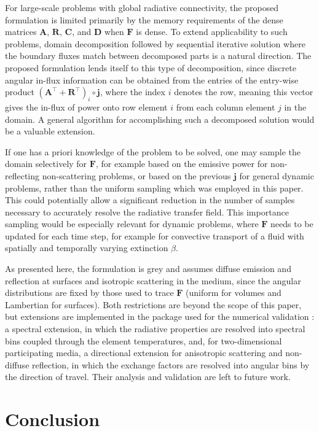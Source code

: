 \documentclass[preprint,1p,times]{elsarticle}
\theoremstyle{plain}
\theoremstyle{definition}
\theoremstyle{remark}
\begin{document}
For large-scale problems with global radiative connectivity, the proposed formulation is limited primarily by the memory requirements of the dense matrices $\mathbf{A}$, $\mathbf{R}$, $\mathbf{C}$, and $\mathbf{D}$ when $\mathbf{F}$ is dense. To extend applicability to such problems, domain decomposition followed by sequential iterative solution where the boundary fluxes match between decomposed parts is a natural direction. The proposed formulation lends itself to this type of decomposition, since discrete angular in-flux information can be obtained from the entries of the entry-wise product $(\mathbf{A}^\top+\mathbf{R}^\top)_i \circ \mathbf{j}$, where the index $i$ denotes the row, meaning this vector gives the in-flux of power onto row element $i$ from each column element $j$ in the domain. A general algorithm for accomplishing such a decomposed solution would be a valuable extension.

If one has a priori knowledge of the problem to be solved, one may sample the domain selectively for $\mathbf{F}$, for example based on the emissive power for non-reflecting non-scattering problems, or based on the previous $\mathbf{j}$ for general dynamic problems, rather than the uniform sampling which was employed in this paper. This could potentially allow a significant reduction in the number of samples necessary to accurately resolve the radiative transfer field. This importance sampling would be especially relevant for dynamic problems, where $\mathbf{F}$ needs to be updated for each time step, for example for convective transport of a fluid with spatially and temporally varying extinction $\beta$.

As presented here, the formulation is grey and assumes diffuse emission and reflection at surfaces and isotropic scattering in the medium, since the angular distributions are fixed by those used to trace $\mathbf{F}$ (uniform for volumes and Lambertian for surfaces). Both restrictions are beyond the scope of this paper, but extensions are implemented in the package used for the numerical validation \citep{Bielefeld2024}: a spectral extension, in which the radiative properties are resolved into spectral bins coupled through the element temperatures, and, for two-dimensional participating media, a directional extension for anisotropic scattering and non-diffuse reflection, in which the exchange factors are resolved into angular bins by the direction of travel. Their analysis and validation are left to future work.

\section{Conclusion}
\label{sec:conclusion}
\end{document}
